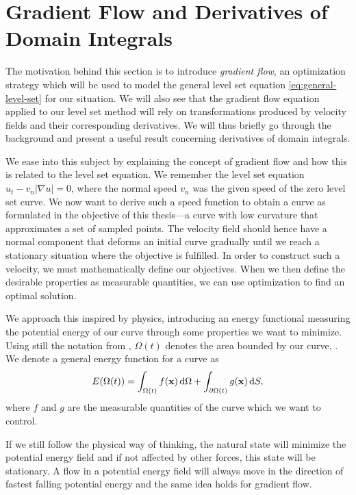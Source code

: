 \section{Gradient Flow and Derivatives of Domain Integrals} \label{sec:shape-derivatives}
The motivation behind this section is to introduce \textit{gradient flow}, an optimization strategy which will be used to model the general level set equation \eqref{eq:general-level-set} for our situation. We will also see that the gradient flow equation applied to our level set method will rely on transformations produced by velocity fields and their corresponding derivatives. We will thus briefly go through the background and present a useful result concerning derivatives of domain integrals.

We ease into this subject by explaining the concept of gradient flow and how this is related to the level set equation. We remember the level set equation $u_t - v_n|\nabla u|=0$, where the normal speed $v_n$ was the given speed of the zero level set curve. We now want to derive such a speed function to obtain a curve as formulated in the objective of this thesis---a curve with low curvature that approximates a set of sampled points. The velocity field should hence have a normal component that deforms an initial curve gradually until we reach a stationary situation where the objective is fulfilled. In order to construct such a velocity, we must mathematically define our objectives. When we then define the desirable properties as measurable quantities, we can use optimization to find an optimal solution.

We approach this inspired by physics, introducing an energy functional measuring the potential energy of our curve through some properties we want to minimize. Using still the notation from , $\Omega(t)$ denotes the area bounded by our curve, \curve. We denote a general energy function for a curve as
\begin{equation}
    E(\Omega(t)) = \int_{\Omega(t)}f(\mathbf{x}) \mathop{}\!\mathrm{d} \Omega + \int_{\partial \Omega(t)} g(\mathbf{x})\mathop{}\!\mathrm{d} S,
    \label{eq:general-energy}
\end{equation}
where $f$ and $g$ are the measurable quantities of the curve which we want to control.

If we still follow the physical way of thinking, the natural state will minimize the potential energy field and if not affected by other forces, this state will be stationary. A flow in a potential energy field will always move in the direction of fastest falling potential energy and the same idea holds for gradient flow. 

